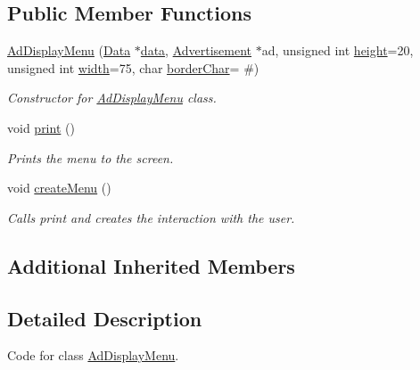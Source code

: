 \subsection*{Public Member Functions}
\begin{DoxyCompactItemize}
\item 
\hyperlink{class_ad_display_menu_a7e62fc564074691ff0ae3a6b82effdcf}{Ad\+Display\+Menu} (\hyperlink{class_data}{Data} $\ast$\hyperlink{class_menu_a3914261df4f4fbadd9c0a854a5f42b0b}{data}, \hyperlink{class_advertisement}{Advertisement} $\ast$ad, unsigned int \hyperlink{class_menu_a84dd6e7e6b263601781683951687bf42}{height}=20, unsigned int \hyperlink{class_menu_a934c7679ed1575cc9924919b9b3eccb1}{width}=75, char \hyperlink{class_menu_a912c40f15f93092412c8d6204c0f8788}{border\+Char}= \textquotesingle{}\#\textquotesingle{})
\begin{DoxyCompactList}\small\item\em Constructor for \hyperlink{class_ad_display_menu}{Ad\+Display\+Menu} class. \end{DoxyCompactList}\item 
\hypertarget{class_ad_display_menu_acf175cade9d9e5a6d65f1eb901f17a84}{}void \hyperlink{class_ad_display_menu_acf175cade9d9e5a6d65f1eb901f17a84}{print} ()\label{class_ad_display_menu_acf175cade9d9e5a6d65f1eb901f17a84}

\begin{DoxyCompactList}\small\item\em Prints the menu to the screen. \end{DoxyCompactList}\item 
\hypertarget{class_ad_display_menu_ae10113101504905c1cf802085c603a8b}{}void \hyperlink{class_ad_display_menu_ae10113101504905c1cf802085c603a8b}{create\+Menu} ()\label{class_ad_display_menu_ae10113101504905c1cf802085c603a8b}

\begin{DoxyCompactList}\small\item\em Calls print and creates the interaction with the user. \end{DoxyCompactList}\end{DoxyCompactItemize}
\subsection*{Additional Inherited Members}


\subsection{Detailed Description}
Code for class \hyperlink{class_ad_display_menu}{Ad\+Display\+Menu}. 

